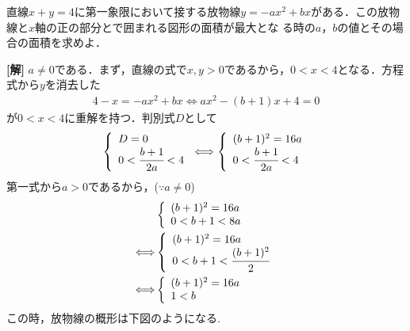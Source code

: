 \documentclass[a4j]{jarticle}
\begin{document}

     \begin{oframed}
     直線$x+y=4$に第一象限において接する放物線$y=-ax^2+bx$がある．この放物線と$x$軸の正の部分とで囲まれる図形の面積が最大とな
     る時の$a$，$b$の値とその場合の面積を求めよ．
     \end{oframed}

\setlength{\columnseprule}{0.4pt}
\begin{multicols}{2}
{\bf[解]} $a\not=0$である．まず，直線の式で$x,y>0$であるから，$0<x<4$となる．方程式から$y$を消去した
     \begin{align*}
     4-x=-ax^2+bx \Longleftrightarrow ax^2-(b+1)x+4=0
     \end{align*}
が$0<x<4$に重解を持つ．判別式$D$として
     \begin{align*}
     \left\{
          \begin{array}{l}
          D=0 \\
          0<\cfrac{b+1}{2a}<4
         \end{array}
    \right.\Longleftrightarrow
    \left\{
          \begin{array}{l}
          (b+1)^2=16a \\
          0<\cfrac{b+1}{2a}<4
         \end{array}
    \right.
     \end{align*}
第一式から$a>0$であるから，($\because a\not=0$)
    \begin{align}
    &\left\{
          \begin{array}{l}
          (b+1)^2=16a \\
          0<b+1<8a
         \end{array}
    \right. \nonumber\\
    \Longleftrightarrow
    &\left\{
          \begin{array}{l}
          (b+1)^2=16a \\
          0<b+1<\cfrac{(b+1)^2}{2}
         \end{array}
    \right. \nonumber\\
    \Longleftrightarrow
    &\left\{
          \begin{array}{l}
          (b+1)^2=16a \\
          1<b
         \end{array}
    \right.  \label{1}
     \end{align}
この時，放物線の概形は下図のようになる.
     \begin{center}

\end{center}
\end{multicols}
\end{document}
